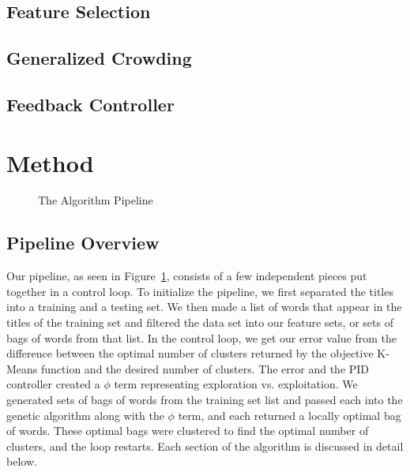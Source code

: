 \documentclass{sig-alternate}
\begin{document}
\subsection{Feature Selection}
\cite{feature:feedback}

\subsection{Generalized Crowding}

\subsection{Feedback Controller}

\section{Method}
\begin{figure}[t]
\centering
{}
\caption{The Algorithm Pipeline}
\label{fig:pipeline}
\end{figure}
\subsection{Pipeline Overview}
Our pipeline, as seen in Figure~\ref{fig:pipeline}, consists of a few independent pieces put together in a control loop. To initialize the pipeline, we first separated the titles into a training and a testing set. We then made a list of words that appear in the titles of the training set and filtered the data set into our feature sets, or sets of bags of words from that list. In the control loop, we get our error value from the difference between the optimal number of clusters returned by the objective K-Means function and the desired number of clusters. The error and the PID controller created a $\phi$ term representing exploration vs. exploitation. We generated sets of bags of words from the training set list and passed each into the genetic algorithm along with the $\phi$ term, and each returned a locally optimal bag of words. These optimal bags were clustered to find the optimal number of clusters, and the loop restarts. Each section of the algorithm is discussed in detail below.
\end{document}
